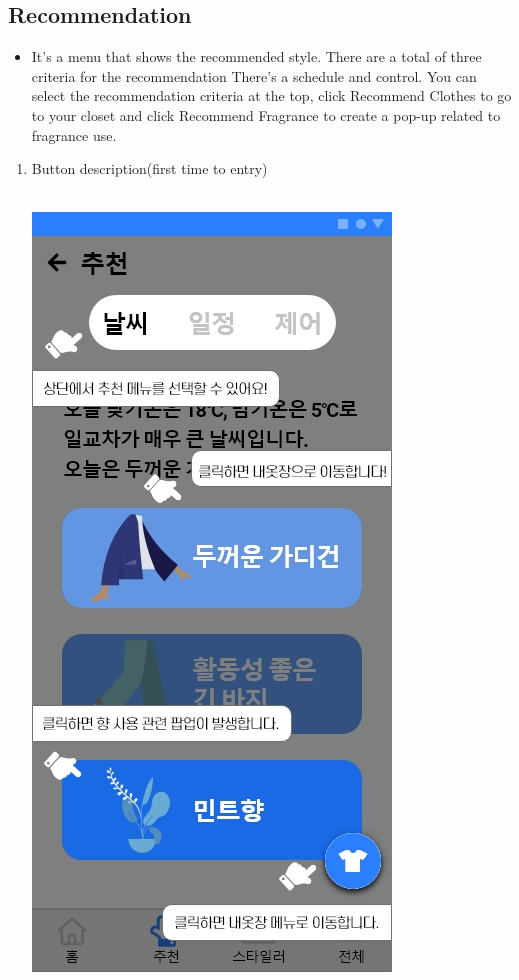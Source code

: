 \documentclass[conference]{IEEEtran}
\begin{document}
\subsection{Recommendation}
\begin{itemize}
\item[] It's a menu that shows the recommended style. There are a total of three criteria for the recommendation There's a schedule and control. You can select the recommendation criteria at the top, click Recommend Clothes to go to your closet and click Recommend Fragrance to create a pop-up related to fragrance use.\\
\end{itemize}
    \begin{enumerate}
    \item Button description(first time to entry) \\ \\
    \centerline{\includegraphics[scale=0.30]{9. 추천 처음 진입.jpg}}

\end{enumerate}
\end{document}

